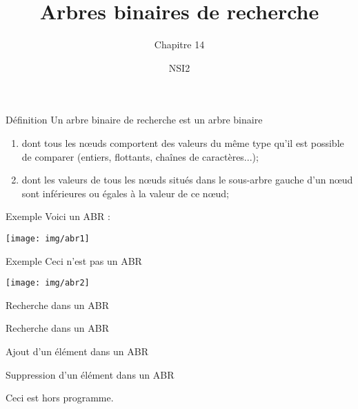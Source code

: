 \documentclass[10pt]{beamer}
\title{Arbres binaires de recherche}
\subtitle{Chapitre 14}
\author{NSI2}
\begin{document}
\maketitle

\begin{frame}{Définition}
Un arbre binaire de recherche est un arbre binaire\pause
\begin{enumerate}[--]
    \item dont tous les n\oe uds comportent des valeurs du même type qu'il est possible de comparer (entiers, flottants, chaînes de caractères...);\pause
    \item dont les valeurs de tous les n\oe uds situés dans le \alert{sous-arbre gauche} d'un n\oe ud sont \alert{inférieures ou égales} à la valeur de ce n\oe ud;\pause
\end{enumerate}
 
\end{frame}
\begin{frame}{Exemple}
Voici un ABR :
\begin{center}
\texttt{[image: img/abr1]}
\end{center}
\end{frame}
\begin{frame}{Exemple}
Ceci n'est pas un ABR
    \begin{center}
        \texttt{[image: img/abr2]}
    \end{center}
\end{frame}
\begin{frame}{Recherche dans un ABR}
        \begin{center}
    \end{center}
\end{frame}
\begin{frame}{Recherche dans un ABR}
    \begin{center}
    \end{center}
\end{frame}
\begin{frame}{Ajout d'un élément dans un ABR}
    \begin{center}
    \end{center}
\end{frame}

\begin{frame}{Suppression d'un élément dans un ABR}
    \begin{center}
    \end{center}

    \alert{Ceci est hors programme.}
\end{frame}
\end{document}

